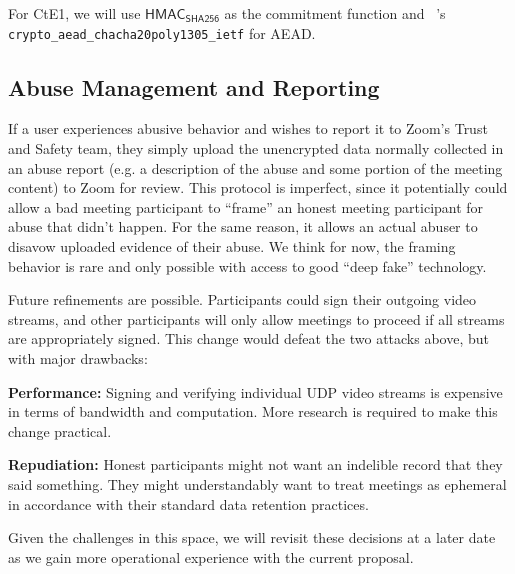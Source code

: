 For \textsf{CtE1}, we will use $\textsf{HMAC}_{\textsf{SHA256}}$ as the commitment function and
\sodium{}~\cite{libsodium}'s \linebreak \texttt{crypto\_aead\_chacha20poly1305\_ietf} for AEAD.

\subsection{Abuse Management and Reporting}
If a user experiences abusive behavior and wishes to report it to Zoom's Trust and Safety team, they simply upload the unencrypted data normally collected in an abuse report (e.g. a description of the abuse and some portion of the meeting content) to Zoom for review. This protocol is imperfect, since it potentially could allow a bad meeting participant to ``frame'' an honest meeting participant for abuse that didn't happen. For the same reason, it allows an actual abuser to disavow uploaded evidence of their abuse. We think for now, the framing behavior is rare and only possible with access to good ``deep fake'' technology.

Future refinements are possible. Participants could sign their outgoing video streams, and other participants will only allow meetings to proceed if all streams are appropriately signed. This change would defeat the two attacks above, but with major drawbacks:
%
\begin{description}
    \item {\bf Performance:} Signing and verifying individual UDP video streams is expensive in terms of bandwidth and computation. More research is required to make this change practical.
    \item {\bf Repudiation:} Honest participants might not want an indelible record that they said something. They might understandably want to treat meetings as ephemeral in accordance with their standard data retention practices.
\end{description}

Given the challenges in this space, we will revisit these decisions at a later date as we gain more operational experience with the current proposal.

